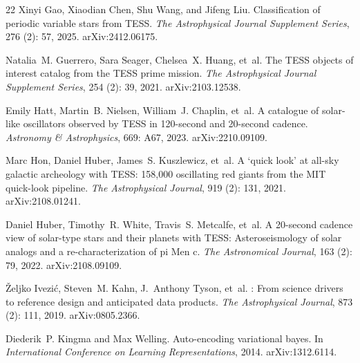 \documentclass{article}
\begin{document}
\begin{thebibliography}{22}
Xinyi Gao, Xiaodian Chen, Shu Wang, and Jifeng Liu.
\newblock Classification of periodic variable stars from {TESS}.
\newblock \emph{The Astrophysical Journal Supplement Series}, 276
  (2): 57, 2025.
\newblock arXiv:2412.06175.

Natalia~M. Guerrero, Sara Seager, Chelsea~X. Huang, et~al.
\newblock The {TESS} objects of interest catalog from the {TESS} prime mission.
\newblock \emph{The Astrophysical Journal Supplement Series}, 254
  (2): 39, 2021.
\newblock arXiv:2103.12538.

Emily Hatt, Martin~B. Nielsen, William~J. Chaplin, et~al.
\newblock A catalogue of solar-like oscillators observed by {TESS} in
  120-second and 20-second cadence.
\newblock \emph{Astronomy \& Astrophysics}, 669: A67, 2023.
\newblock arXiv:2210.09109.

Marc Hon, Daniel Huber, James~S. Kuszlewicz, et~al.
\newblock A `quick look' at all-sky galactic archeology with {TESS}: 158,000
  oscillating red giants from the {MIT} quick-look pipeline.
\newblock \emph{The Astrophysical Journal}, 919 (2): 131,
  2021.
\newblock arXiv:2108.01241.

Daniel Huber, Timothy~R. White, Travis~S. Metcalfe, et~al.
\newblock A 20-second cadence view of solar-type stars and their planets with
  {TESS}: Asteroseismology of solar analogs and a re-characterization of pi
  {Men} c.
\newblock \emph{The Astronomical Journal}, 163 (2): 79, 2022.
\newblock arXiv:2108.09109.

\v{Z}eljko Ivezi\'{c}, Steven~M. Kahn, J.~Anthony Tyson, et~al.
: From science drivers to reference design and anticipated data
  products.
\newblock \emph{The Astrophysical Journal}, 873 (2): 111,
  2019.
\newblock arXiv:0805.2366.

Diederik~P. Kingma and Max Welling.
\newblock Auto-encoding variational bayes.
\newblock In \emph{International Conference on Learning Representations}, 2014.
\newblock arXiv:1312.6114.


\end{thebibliography}
\end{document}
